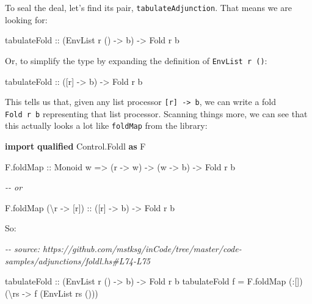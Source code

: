 \documentclass[]{article}
\newenvironment{Shaded}{}{}
\newcommand{\CommentTok}[1]{\textcolor[rgb]{0.38,0.63,0.69}{\textit{#1}}}
\newcommand{\DataTypeTok}[1]{\textcolor[rgb]{0.56,0.13,0.00}{#1}}
\newcommand{\KeywordTok}[1]{\textcolor[rgb]{0.00,0.44,0.13}{\textbf{#1}}}
\newcommand{\NormalTok}[1]{#1}
\newcommand{\OperatorTok}[1]{\textcolor[rgb]{0.40,0.40,0.40}{#1}}
\newcommand{\OtherTok}[1]{\textcolor[rgb]{0.00,0.44,0.13}{#1}}
\begin{document}
To seal the deal, let's find its pair, \texttt{tabulateAdjunction}. That means
we are looking for:

\begin{Shaded}
\begin{Highlighting}[]
\OtherTok{tabulateFold ::}\NormalTok{ (}\DataTypeTok{EnvList}\NormalTok{ r () }\OtherTok{{-}>}\NormalTok{ b) }\OtherTok{{-}>} \DataTypeTok{Fold}\NormalTok{ r b}
\end{Highlighting}
\end{Shaded}

Or, to simplify the type by expanding the definition of \texttt{EnvList\ r\ ()}:

\begin{Shaded}
\begin{Highlighting}[]
\OtherTok{tabulateFold ::}\NormalTok{ ([r] }\OtherTok{{-}>}\NormalTok{ b) }\OtherTok{{-}>} \DataTypeTok{Fold}\NormalTok{ r b}
\end{Highlighting}
\end{Shaded}

This tells us that, given any list processor
\texttt{{[}r{]}\ -\textgreater{}\ b}, we can write a fold \texttt{Fold\ r\ b}
representing that list processor. Scanning things more, we can see that this
actually looks a lot like \texttt{foldMap} from the library:

\begin{Shaded}
\begin{Highlighting}[]
\KeywordTok{import} \KeywordTok{qualified} \DataTypeTok{Control.Foldl} \KeywordTok{as} \DataTypeTok{F}

\NormalTok{F.foldMap}
\OtherTok{    ::} \DataTypeTok{Monoid}\NormalTok{ w}
    \OtherTok{=>}\NormalTok{ (r }\OtherTok{{-}>}\NormalTok{ w)}
    \OtherTok{{-}>}\NormalTok{ (w }\OtherTok{{-}>}\NormalTok{ b)}
    \OtherTok{{-}>} \DataTypeTok{Fold}\NormalTok{ r b}

\CommentTok{{-}{-} or}

\NormalTok{F.foldMap (\textbackslash{}r }\OtherTok{{-}>}\NormalTok{ [r])}
\OtherTok{    ::}\NormalTok{ ([r] }\OtherTok{{-}>}\NormalTok{ b)}
    \OtherTok{{-}>} \DataTypeTok{Fold}\NormalTok{ r b}
\end{Highlighting}
\end{Shaded}

So:

\begin{Shaded}
\begin{Highlighting}[]
\CommentTok{{-}{-} source: https://github.com/mstksg/inCode/tree/master/code{-}samples/adjunctions/foldl.hs\#L74{-}L75}

\OtherTok{tabulateFold ::}\NormalTok{ (}\DataTypeTok{EnvList}\NormalTok{ r () }\OtherTok{{-}>}\NormalTok{ b) }\OtherTok{{-}>} \DataTypeTok{Fold}\NormalTok{ r b}
\NormalTok{tabulateFold f }\OtherTok{=}\NormalTok{ F.foldMap (}\OperatorTok{:}\NormalTok{[]) (\textbackslash{}rs }\OtherTok{{-}>}\NormalTok{ f (}\DataTypeTok{EnvList}\NormalTok{ rs ()))}
\end{Highlighting}
\end{Shaded}
\end{document}
